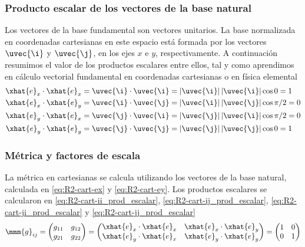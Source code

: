 \subsubsection{Producto escalar de los vectores de la base natural}
Los vectores de la base fundamental son vectores unitarios.
La base normalizada en coordenadas cartesianas en este espacio está formada por los vectores $\uvec{\i}$ y $\uvec{\j}$, en los ejes $x$ e $y$, respectivamente.
A continuación resumimos el valor de los productos escalares entre ellos, tal y como
aprendimos en cálculo vectorial fundamental en coordenadas cartesianas o en física
elemental
\begin{subequations}
  \begin{align}
    \label{eq:R2-cart-ii_prod_escalar}
    \xhat{e}_x\cdot\xhat{e}_x = \uvec{\i}\cdot\uvec{\i}
    &= |\uvec{\i}|\,|\uvec{\i}|\cos 0 = 1\\
    \label{eq:R2-cart-ij_prod_escalar}    
    \xhat{e}_x\cdot\xhat{e}_y = \uvec{\i}\cdot\uvec{\j}
    &= |\uvec{\i}|\,|\uvec{\j}|\cos\pi/2 = 0\\
    \label{eq:R2-cart-ji_prod_escalar} 
    \xhat{e}_y\cdot\xhat{e}_x = \uvec{\j}\cdot\uvec{\i}
    &= |\uvec{\j}|\,|\uvec{\i}|\cos\pi/2 = 0\\
    \label{eq:R2-cart-jj_prod_escalar}
    \xhat{e}_y\cdot\xhat{e}_y = \uvec{\j}\cdot\uvec{\j}
    &= |\uvec{\j}|\,|\uvec{\j}|\cos 0 = 1
  \end{align}
\end{subequations}

\subsubsection{Métrica y factores de escala}
La métrica en cartesianas se calcula utilizando los vectores de la base natural,
calculada en \eqref{eq:R2-cart-ex} y \eqref{eq:R2-cart-ey}.
Los productos escalares se calcularon en \eqref{eq:R2-cart-ii_prod_escalar},
\eqref{eq:R2-cart-ij_prod_escalar}, \eqref{eq:R2-cart-ji_prod_escalar} y
\eqref{eq:R2-cart-jj_prod_escalar}
\begin{equation}\label{eq:R2-cart-metrica}
  \mmm{g}_{ij}
  = \begin{pmatrix}
    g_{11} & g_{12}\\
    g_{21} & g_{22}
    \end{pmatrix}
  = \begin{pmatrix}
      \xhat{e}_x\cdot\xhat{e}_x & \xhat{e}_x\cdot\xhat{e}_y\\
      \xhat{e}_y\cdot\xhat{e}_x & \xhat{e}_y\cdot\xhat{e}_y
  \end{pmatrix}
  = \begin{pmatrix}
    1 & 0\\
    0 & 1
  \end{pmatrix}
\end{equation}


